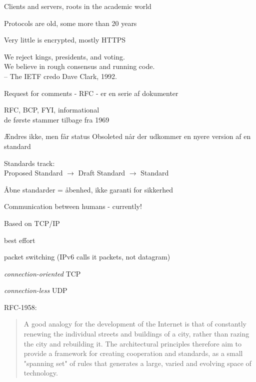 \documentclass[Screen16to9,17pt]{foils}
\begin{document}

\begin{list2}
\item Clients and servers, roots in the academic world
\item Protocols are old, some more than 20 years
\item Very little is encrypted, mostly HTTPS
\end{list2}



{\hlkbig \color{titlecolor}
We reject kings, presidents, and voting.\\
We believe in rough consensus and running code.\\
-- The IETF credo Dave Clark, 1992.}

\begin{list1}
\item Request for comments - RFC - er en serie af dokumenter
\item RFC, BCP, FYI, informational\\
de første stammer tilbage fra 1969
\item Ændres ikke, men får status Obsoleted når der udkommer en nyere
  version af en standard
\item Standards track:\\
Proposed Standard $\rightarrow$ Draft Standard $\rightarrow$ Standard
\item  Åbne standarder = åbenhed, ikke garanti for sikkerhed
\end{list1}



\begin{list1}
\item Communication between humans - currently!
\item Based on TCP/IP
\begin{list2}
\item best effort
\item packet switching (IPv6 calls it packets, not datagram)
\item \emph{connection-oriented} TCP
\item \emph{connection-less} UDP
\end{list2}
\end{list1}

RFC-1958:
\begin{quote}
 A good analogy for the development of the Internet is that of
 constantly renewing the individual streets and buildings of a city,
 rather than razing the city and rebuilding it. The architectural
 principles therefore aim to provide a framework for creating
 cooperation and standards, as a small "spanning set" of rules that
 generates a large, varied and evolving space of technology.
\end{quote}
\end{document}
